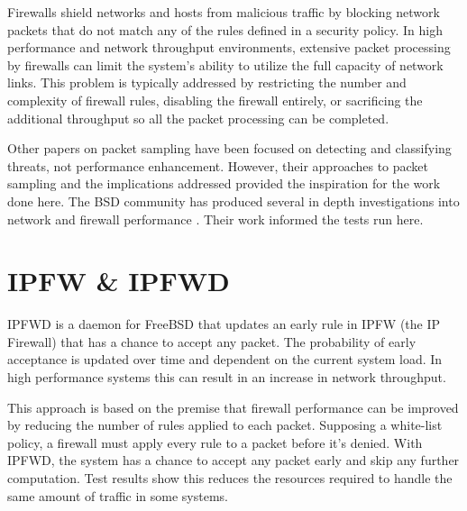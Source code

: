 \documentclass[journal]{IEEEtran}
\begin{document}
  Firewalls shield networks and hosts from malicious traffic by blocking
  network packets that do not match any of the rules defined in a security
  policy. 
  In high performance and network throughput environments, extensive packet
  processing by firewalls can limit the system's ability to utilize the full
  capacity of network links. This problem is typically addressed by restricting
  the number and complexity of firewall rules, disabling the firewall entirely,
  or sacrificing the additional throughput so all the packet processing can be
  completed.
  

    Other papers \cite{exploitingpacketsampling, analysisnetflow,
    monitoringpacketsampling} on packet sampling have been focused on detecting
    and classifying threats, not performance enhancement. However, their
    approaches to packet sampling and the implications addressed provided the
    inspiration for the work done here. The BSD community has produced several in depth investigations into network
    and firewall performance \cite{ipfwvspf,optimizingfreebsd}. Their work
    informed the tests run here.


\section{IPFW \& IPFWD}

  IPFWD is a daemon for FreeBSD that updates an early rule in IPFW (the IP
  Firewall) that has a chance to accept any packet. The probability of early
  acceptance is updated over time and dependent on the current system load. In
  high performance systems this can result in an increase in network
  throughput.

  This approach is based on the premise that firewall performance can be
  improved by reducing the number of rules applied to each packet. Supposing a
  white-list policy, a firewall must apply every rule to a packet before
  it's denied.  With IPFWD, the system has a chance to accept any packet early
  and skip any further computation. Test results show this reduces the 
  resources required to handle the same amount of traffic in some systems.
\end{document}
